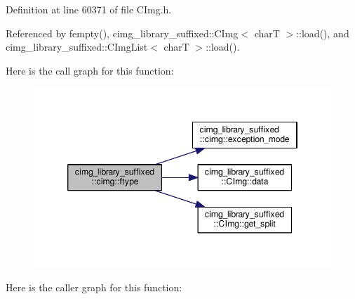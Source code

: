 Definition at line 60371 of file C\+Img.\+h.



Referenced by fempty(), cimg\+\_\+library\+\_\+suffixed\+::\+C\+Img$<$ char\+T $>$\+::load(), and cimg\+\_\+library\+\_\+suffixed\+::\+C\+Img\+List$<$ char\+T $>$\+::load().

Here is the call graph for this function\+:
\nopagebreak
\begin{figure}[H]
\begin{center}
\leavevmode
\includegraphics[width=346pt]{d4/d9b/namespacecimg__library__suffixed_1_1cimg_a56c2dbfe99d9f6e6bc1be9d03b0ddaaa_cgraph}
\end{center}
\end{figure}
Here is the caller graph for this function\+:
\nopagebreak
